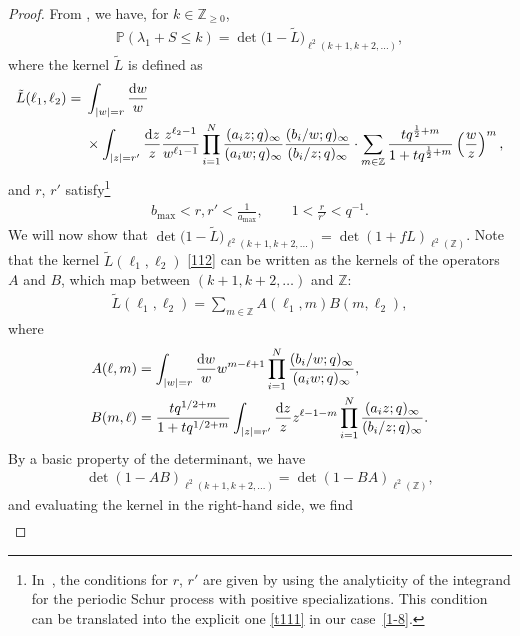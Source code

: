 \documentclass[pdftex]{sigma}
\numberwithin{equation}{section}
\def\i{\infty}
\def\l{\lambda}
\def\P{\mathbb{P}}
\def\Z{\mathbb{Z}}
\begin{document}
\begin{proof}
From \cite[Theorem 2.2]{Borodin2007PeriodicSchur}, we have, for $k\in\Z_{\ge 0}$,
\begin{align*}%
\P(\l_1+S\le k)
=\det\big(1-\tilde{L}\big)_{\ell^2(k+1,k+2,\dots)},
\end{align*}
where the kernel $\tilde{L}$ is defined as
\begin{align}
\tilde{L}(\ell_1,\ell_2)={}&\int_{|w|=r}\frac{{\rm d}w}{w}\nonumber\\
&\times\int_{|z|=r'}\frac{{\rm d}z}{z}\frac{z^{\ell_2-1}}{w^{\ell_1-1}}
\prod_{i=1}^N
\frac{(a_iz;q)_\i}{(a_i w;q)_{\i}}
\frac{(b_i/w;q)_\i}{(b_i/z;q)_\i}
\cdot
\sum_{m\in \Z}
\frac{t q^{\frac12+m}}{1+t q^{\frac12+m}}
\left(\frac{w}{z}\right)^m,
\label{112}
\end{align}
and $r$, $r'$ satisfy\footnote{In~\cite{BeteaBouttier2019PeriodicSchur,Borodin2007PeriodicSchur},
the conditions for $r$, $r'$ are
given by using the analyticity
of the integrand for the periodic
Schur process with positive specializations.
This condition can be translated into
the explicit one \eqref{t111}
in our case~\eqref{1-8}.
}
\begin{align}
b_{\max}<r,r'<\frac{1}{a_{\max}},\qquad 1<\frac{r}{r'}<q^{-1}.
\label{t111}
\end{align}
We will now show that $\det\big(1-\tilde{L}\big)_{\ell^2(k+1,k+2,\dots)} =\det(1+fL)_{\ell^2(\Z)}$. Note that the kernel $\tilde{L}(\ell_1,\ell_2)$ \eqref{112} can be written as the kernels of the operators $A$ and $B$, which map between $(k+1,k+2,\dots)$ and $\mathbb{Z}$:
\begin{align*}%
\tilde{L}(\ell_1,\ell_2)=\sum_{m\in\Z}A(\ell_1,m)
B(m, \ell_2),
\end{align*}
where
\begin{align*}%
A(\ell,m)&=\int_{|w|=r}\frac{{\rm d}w}{w} w^{m-\ell+1}
\prod_{i=1}^N
\frac{(b_i/w;q)_\i}{(a_i w;q)_{\i}},
\\
B(m,\ell)&=
\frac{t q^{1/2+m}}{1+t q^{1/2+m}}
\int_{|z|=r'}\frac{{\rm d}z}{z} z^{\ell-1-m}
\prod_{i=1}^N
\frac{(a_iz;q)_\i}{(b_i/z;q)_\i}.
\end{align*}
By a basic property of the determinant, we have
\begin{align*}%
\det(1-AB)_{\ell^2(k+1,k+2,\dots)}=\det(1-BA)_{\ell^2(\Z)},
\end{align*}
and evaluating the kernel in the right-hand side, we find
\begin{gather*}%

\end{gather*}
\end{proof}
\end{document}
